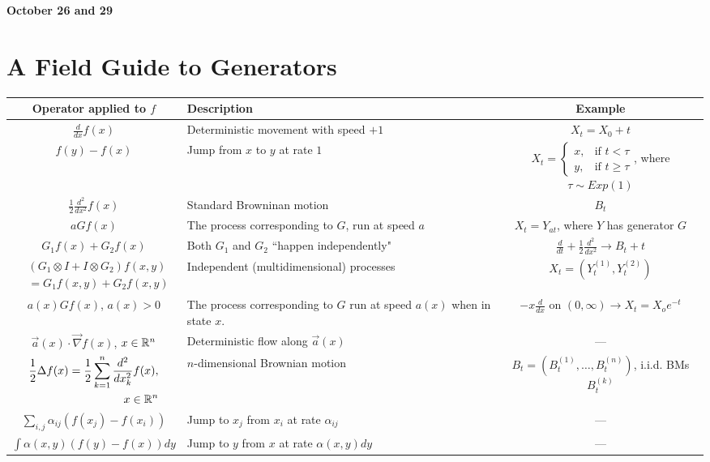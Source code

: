 \documentclass[12pt]{article}
\author{Austen}
\date{October 26 and 29}
\begin{document}
%

\textbf{\Large October 26 and 29}

\section{A Field Guide to Generators}

\begin{tabular}{|c|p{6cm}|c|}
\hline
\textbf{Operator applied to $f$}
	& \textbf{Description}
	& \textbf{Example} \\	
\hline
	$\frac{d}{dx}f(x)$
	&  Deterministic movement with speed $+1$
	&  $X_t = X_0 + t$\\
\hline
	$f(y) - f(x)$
	&  Jump from $x$ to $y$ at rate $1$
	& $X_t=\begin{cases}x, & \text{if } t<\tau \\ y, & \text{if } t\geq\tau \end{cases}$,
		where $ \tau\sim Exp(1)$\\	
\hline
	$\frac{1}{2}\frac{d^2}{dx^2}f(x)$
	&  Standard Browninan motion
	& $B_t$ \\	
\hline
	$aGf(x)$
	& The process corresponding to $G$, run at speed $a$
	& $X_t = Y_{at}$, where $Y$ has generator $G$\\
\hline
	$G_1 f(x) + G_2 f(x)$
	& Both $G_1$ and $G_2$ ``happen independently"
	& $\frac{d}{dt} + \frac{1}{2} \frac{d^2}{dx^2} \longrightarrow B_t + t$\\
\hline
	$\begin{aligned} &(G_1 \otimes I + I \otimes G_2) f(x, y) \\ &= G_1 f(x,y) + G_2 f(x, y) \end{aligned}$
	& Independent (multidimensional) processes
	& $X_t = (Y_t^{(1)} , Y_t^{(2)})$ \\
\hline
	$a(x) G f(x)$, $a(x)>0$
	& The process corresponding to $G$ run at speed $a(x)$ when in state $x$.
	& $-x \frac{d}{dx}$ on $(0,\infty) \longrightarrow X_t = X_o e^{-t}$ \\
\hline
	$\vec{a}(x) \cdot \vec{\nabla} f(x)$, $x\in\mathbb{R}^n$
	& Deterministic flow along $\vec{a}(x)$
	& --- \\
\hline
	$\begin{aligned} \frac{1}{2}\Delta f(x) = \frac{1}{2}\sum\limits_{k=1}^{n}\frac{d^2}{dx_k^2} f(x),\\ x\in\mathbb{R}^n \end{aligned}$
	& $n$-dimensional Brownian motion
	& $B_t = (B_t^{(1)}, \dots, B_t^{(n)})$, i.i.d. BMs $B_t^{(k)}$ \\
\hline
	$\sum\limits_{i,j} \alpha_{ij}\left( f(x_j) - f(x_i)  \right)$
	& Jump to $x_j$ from $x_i$ at rate $\alpha_{ij}$
	& --- \\
\hline
	$\int \alpha(x, y) \left( f(y) - f(x)  \right) dy$
	& Jump to $y$ from $x$ at rate $\alpha(x, y)dy$
	& --- \\
\hline
\end{tabular}
\end{document}
